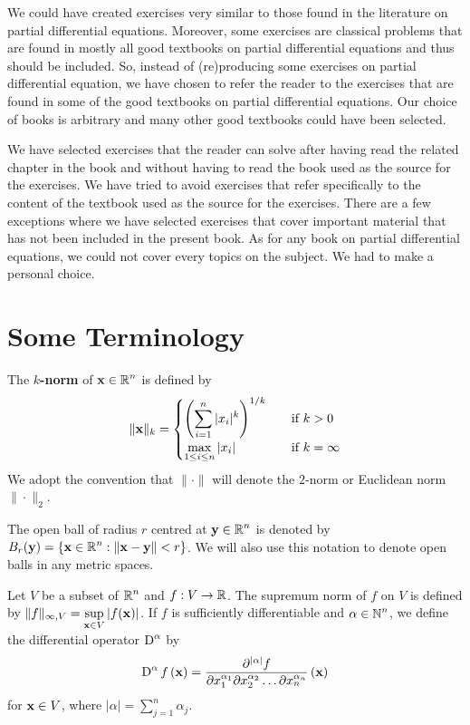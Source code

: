 We could have created exercises very similar to those found in the
literature on partial differential equations.  Moreover, some
exercises are classical problems that are found in mostly all good textbooks on
partial differential equations and thus should be included.  So, instead of
(re)producing some exercises on partial differential equation, we have
chosen to refer the reader to the exercises that are found in some of
the good textbooks on partial differential equations.  Our choice of
books is arbitrary and many other good textbooks could have been selected.

We have selected exercises that the reader can solve after having read
the related chapter in the book and without having to read the book
used as the source for the exercises.  We have tried to avoid exercises
that refer specifically to the content of the textbook used as the
source for the exercises.  There are a few exceptions where
we have selected exercises that cover important material that has not
been included in the present book.  As for any book on partial
differential equations, we could not cover every topics on the
subject.  We had to make a personal choice.

\section*{Some Terminology}

The {\bfseries $k$-norm} of
$\displaystyle \mathbf{x} \in \mathbb{R}^n$ is defined by
\[
\|\mathbf{x}\|_k =
\begin{cases}
\displaystyle \left(\sum_{i=1}^n |x_i|^k\right)^{1/k} & \quad \text{if}\ k > 0 \\
\displaystyle \max_{1\leq i \leq n} |x_i| & \quad \text{if} \ k = \infty  
\end{cases}
\]
We adopt the convention that $\|\cdot\|$ will denote the $2$-norm or
Euclidean norm $\|\cdot\|_2$.

The open ball of radius $r$ centred at
$\displaystyle \mathbf{y} \in \mathbb{R}^n$ is denoted
by $\displaystyle B_r(\mathbf{y}) = \left\{ \mathbf{x} \in \mathbb{R}^n :
\left\|\mathbf{x}-\mathbf{y} \right\| < r \right\}$.  We will also use this
notation to denote open balls in any metric spaces.

Let $V$ be a subset of $\displaystyle \mathbb{R}^n$ and $f:V \to \mathbb{R}$.  The
supremum norm of $f$ on $V$ is defined by
$\displaystyle \|f\|_{\infty,V} = \sup_{\mathbf{x}\in V} |f(\mathbf{x})|$.
If $f$ is sufficiently differentiable and $\displaystyle \alpha \in \mathbb{N}^n$, we
define the differential operator $\displaystyle \operatorname{D}^\alpha$ by
\[
\operatorname{D}^\alpha f\left(\mathbf{x}\right)
= \frac{\partial^{|\alpha|} f}{\partial x_1^{\alpha_1}
\partial x_2^{\alpha_2} \ldots \partial x_n^{\alpha_n}}\left(\mathbf{x}\right)
\]
for $\mathbf{x} \in V$, where $\displaystyle |\alpha| = \sum_{j=1}^n \alpha_j$.

